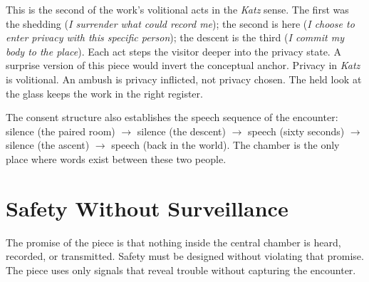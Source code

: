 \documentclass[]{anvil-installation}
\begin{document}
This is the second of the work's volitional acts in the \textit{Katz} sense. The first was the shedding (\textit{I surrender what could record me}); the second is here (\textit{I choose to enter privacy with this specific person}); the descent is the third (\textit{I commit my body to the place}). Each act steps the visitor deeper into the privacy state. A surprise version of this piece would invert the conceptual anchor. Privacy in \textit{Katz} is volitional. An ambush is privacy inflicted, not privacy chosen. The held look at the glass keeps the work in the right register.

The consent structure also establishes the speech sequence of the encounter: silence (the paired room) $\rightarrow$ silence (the descent) $\rightarrow$ speech (sixty seconds) $\rightarrow$ silence (the ascent) $\rightarrow$ speech (back in the world). The chamber is the only place where words exist between these two people.

\section{Safety Without Surveillance}

The promise of the piece is that nothing inside the central chamber is heard, recorded, or transmitted. Safety must be designed without violating that promise. The piece uses only signals that reveal trouble without capturing the encounter.
\end{document}
